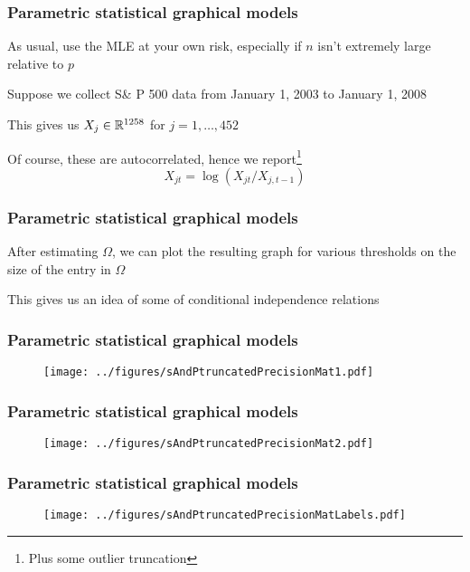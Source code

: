 \documentclass[12pt]{beamer}
\begin{document}
\begin{frame}[fragile]
\frametitle{Parametric statistical graphical models}
As usual, use the MLE at your own risk, especially if $n$ isn't extremely large relative to $p$

\vsp
{} Suppose we collect S\& P 500 data from January 1, 2003 to January 1, 2008


\vsp
This gives us $X_j \in \mathbb{R}^{1258}$ for $j = 1,\ldots, 452$


\vsp
Of course, these are autocorrelated, hence we report\footnote{Plus some outlier truncation}
\[
X_{jt} = \log(X_{jt}/X_{j,t-1})
\]
\end{frame}

\begin{frame}[fragile]
\frametitle{Parametric statistical graphical models}
After estimating $\Omega$, we can plot the resulting graph for various thresholds
on the size of the entry in $\Omega$

\vsp
This gives us an idea of some  of conditional independence relations
\end{frame}

\begin{frame}[fragile]
\frametitle{Parametric statistical graphical models}
\begin{figure}
\centering
\texttt{[image: ../figures/sAndPtruncatedPrecisionMat1.pdf]}
\end{figure}
\end{frame}

\begin{frame}[fragile]
\frametitle{Parametric statistical graphical models}
\begin{figure}
\centering
\texttt{[image: ../figures/sAndPtruncatedPrecisionMat2.pdf]}
\end{figure}
\end{frame}

\begin{frame}[fragile]
\frametitle{Parametric statistical graphical models}
\begin{figure}
\centering
\texttt{[image: ../figures/sAndPtruncatedPrecisionMatLabels.pdf]}
\end{figure}
\end{frame}
\end{document}
